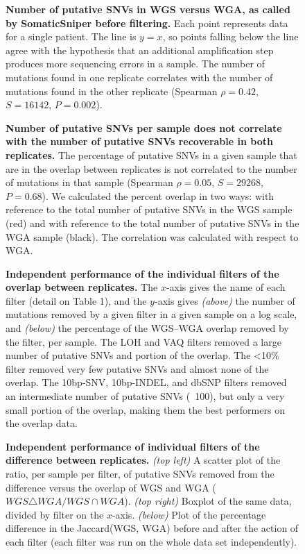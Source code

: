 \documentclass[11 pt]{article} %
\begin{document}
\begin{figure}
\caption{\textbf{Number of putative SNVs in WGS versus WGA, as called by SomaticSniper before filtering.} Each point represents data for a single patient. The line is $y=x$, so points falling below the line agree with the hypothesis that an additional amplification step produces more sequencing errors in a sample. The number of mutations found in one replicate correlates with the number of mutations found in the other replicate (Spearman $\rho=0.42$, $S=16142$, $P=0.002$).}
\label{fig:C282_v_C484}
\end{figure}

\begin{figure}
\caption{\textbf{Number of putative SNVs per sample does not correlate with the number of putative SNVs recoverable in both replicates.} The percentage of putative SNVs in a given sample that are in the overlap between replicates is not correlated to the number of mutations in that sample (Spearman $\rho=0.05$, $S=29268$, $P=0.68$). We calculated the percent overlap in two ways: with reference to the total number of putative SNVs in the WGS sample (red) and with reference to the total number of putative SNVs in the WGA sample (black). The correlation was calculated with respect to WGA.}
\label{fig:unfiltered_total_muts}
\end{figure}

\begin{figure}
\caption{\textbf{Independent performance of the individual filters of the overlap between replicates.} The $x$-axis gives the name of each filter (detail on Table 1), and the $y$-axis gives \textit{(above)} the number of mutations removed by a given filter in a given sample on a log scale, and \textit{(below)} the percentage of the WGS--WGA overlap removed by the filter, per sample. The LOH and VAQ filters removed a large number of putative SNVs and portion of the overlap. The <10\% filter removed very few putative SNVs and almost none of the overlap. The 10bp-SNV, 10bp-INDEL, and dbSNP filters removed an intermediate number of putative SNVs (~100), but only a very small portion of the overlap, making them the best performers on the overlap data. }
\label{fig:boxplot_filtered}
\end{figure}

\begin{figure}
\caption{\textbf{Independent performance of individual filters of the difference between replicates.} \textit{(top left)} A scatter plot of the ratio, per sample per filter, of putative SNVs removed from the difference versus the overlap of WGS and WGA ($WGS \triangle WGA / WGS \cap WGA$). \textit{(top right)} Boxplot of the same data, divided by filter on the $x$-axis. \textit{(below)} Plot of the percentage difference in the Jaccard(WGS, WGA) before and after the action of each filter (each filter was run on the whole data set independently).}
\label{fig:diffset}
\end{figure}
\end{document}
